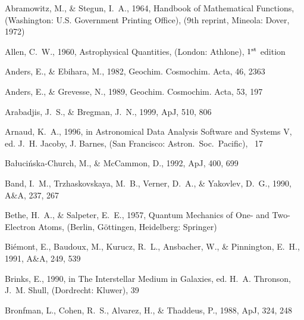 \documentclass{aastex}
\begin{document}
\begin{thebibliography}{}

Abramowitz, M., \& Stegun, I.~A.,  1964,
\newblock Handbook of Mathematical Functions,
\newblock  (Washington: U.S. Government Printing Office),
\newblock (9th reprint, Mineola: Dover, 1972)

Allen, C.~W.,  1960,
\newblock Astrophysical Quantities,
\newblock  (London: Athlone), $1^{\mbox{\scriptsize st}}$ edition

Anders, E., \& Ebihara, M.,  1982, Geochim. Cosmochim. Acta, 46, 2363

Anders, E., \& Grevesse, N.,  1989, Geochim. Cosmochim. Acta, 53, 197

Arabadjis, J.~S., \& Bregman, J.~N.,  1999, ApJ, 510, 806

Arnaud, K.~A.,  1996,
\newblock in Astronomical Data Analysis Software and Systems {V}, ed. J.~H.
  Jacoby, J. Barnes,  (San Francisco: Astron.\ Soc.\ Pacific), ~17

{Ba\l{}uci\'{n}ska}-Church, M., \& {McCammon}, D.,  1992, ApJ, 400, 699

Band, I.~M., Trzhaskovskaya, M.~B., Verner, D.~A., \& Yakovlev, D.~G.,  1990,
  A\&A, 237, 267

Bethe, H.~A., \& Salpeter, E.~E.,  1957,
\newblock Quantum Mechanics of One- and Two-Electron Atoms,
\newblock  (Berlin, G\"ottingen, Heidelberg: Springer)

{Bi\'emont}, E., Baudoux, M., Kurucz, R.~L., Ansbacher, W., \& Pinnington,
  E.~H.,  1991, A\&A, 249, 539

Brinks, E.,  1990,
\newblock in The Interstellar Medium in Galaxies, ed. H.~A. Thronson, J.~M.
  Shull,  (Dordrecht: Kluwer), 39

Bronfman, L., Cohen, R.~S., Alvarez, H., \& Thaddeus, P.,  1988, ApJ, 324, 248


\end{thebibliography}
\end{document}
